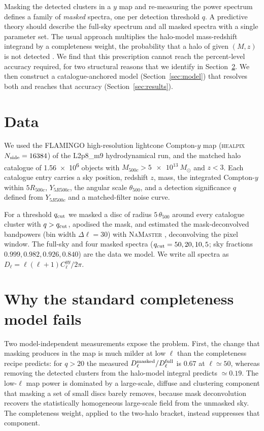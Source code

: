 \documentclass[twocolumn,10pt]{article}
\newcommand{\Cl}{C_\ell}
\newcommand{\thfive}{\theta_{500}}
\newcommand{\qcut}{q_{\rm cut}}
\newcommand{\Msun}{M_\odot}
\begin{document}
Masking the detected clusters in a $y$ map and re-measuring the power spectrum
defines a family of \emph{masked} spectra, one per detection threshold $q$. A
predictive theory should describe the full-sky spectrum and all masked spectra
with a single parameter set. The usual approach multiplies the halo-model
mass-redshift integrand by a completeness weight, the probability that a halo of
given $(M,z)$ is not detected
\citep{KomatsuSeljak2002}. We find that this prescription cannot reach the
percent-level accuracy required, for two structural reasons that we identify in
Section~\ref{sec:why}. We then construct a catalogue-anchored model
(Section~\ref{sec:model}) that resolves both and reaches that accuracy
(Section~\ref{sec:results}).

\section{Data}
\label{sec:data}
We used the FLAMINGO \citep{Schaye2023} high-resolution lightcone Compton-$y$ map
(\textsc{healpix} $N_{\rm side}=16384$) of the L2p8\_m9 hydrodynamical run, and the
matched halo catalogue of \num{1.56e6} objects with $M_{500c}>\SI{5e13}{\Msun}$
and $z<3$. Each catalogue entry carries a sky position, redshift $z$, mass, the
integrated Compton-$y$ within $5R_{500c}$, $Y_{5R500c}$, the angular scale
$\thfive$, and a detection significance $q$ defined from $Y_{5R500c}$ and a
matched-filter noise curve.

For a threshold $\qcut$ we masked a disc of radius $5\,\thfive$ around every
catalogue cluster with $q>\qcut$, apodised the mask, and estimated the
mask-deconvolved bandpowers (bin width $\Delta\ell=30$) with \textsc{NaMaster}
\citep{Alonso2019}, deconvolving the pixel window. The full-sky and four masked
spectra ($\qcut=50,20,10,5$; sky fractions $0.999,0.982,0.926,0.840$) are the
data we model. We write all spectra as $D_\ell=\ell(\ell+1)\Cl^{yy}/2\pi$.

\section{Why the standard completeness model fails}
\label{sec:why}
Two model-independent measurements expose the problem. First, the change that
masking produces in the map is much milder at low $\ell$ than the completeness
recipe predicts: for $q>20$ the measured $D_\ell^{\rm masked}/D_\ell^{\rm full}$
is $0.67$ at $\ell\simeq50$, whereas removing the detected clusters from the
halo-model integral predicts $\simeq0.19$. The low-$\ell$ map power is dominated
by a large-scale, diffuse and clustering component that masking a set of small
discs barely removes, because mask deconvolution recovers the statistically
homogeneous large-scale field from the unmasked sky. The completeness weight,
applied to the two-halo bracket, instead suppresses that component.
\end{document}
